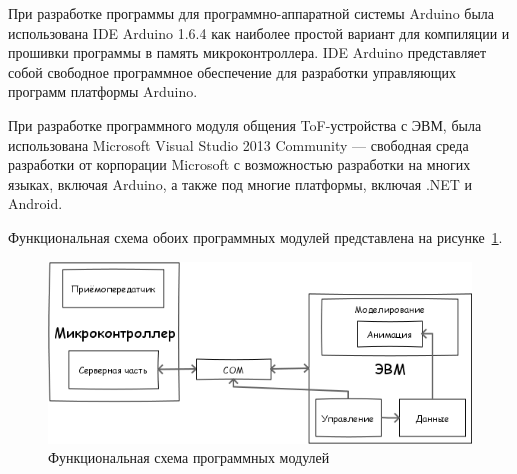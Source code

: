 При разработке программы для программно-аппаратной системы Arduino была использована IDE Arduino 1.6.4 как наиболее простой вариант для компиляции и прошивки программы в память микроконтроллера. IDE Arduino представляет собой свободное программное обеспечение для разработки управляющих программ платформы Arduino.

При разработке программного модуля общения ToF-устройства с ЭВМ, была использована Microsoft Visual Studio 2013 Community --- свободная среда разработки от корпорации Microsoft с возможностью разработки на многих языках, включая Arduino, а также под многие платформы, включая .NET и Android.

Функциональная схема обоих программных модулей представлена на рисунке~\ref{fig:softwarefunc}.

\begin{figure}[ht]
    \includegraphics[width=.8\linewidth]{Figures/softwarefunc.png}
    \caption{Функциональная схема программных модулей}
    \label{fig:softwarefunc}
\end{figure}
